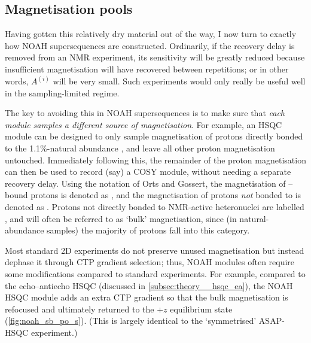 \subsection{Magnetisation pools}
\label{subsec:noah__magpools}

Having gotten this relatively dry material out of the way, I now turn to exactly how NOAH supersequences are constructed.
Ordinarily, if the recovery delay is removed from an NMR experiment, its sensitivity will be greatly reduced because insufficient magnetisation will have recovered between repetitions; or in other words, $A^{(i)}$ will be very small.
Such experiments would only really be useful well in the sampling-limited regime.

The key to avoiding this in NOAH supersequences is to make sure that \textit{each module samples a different source of magnetisation}.
For example, an HSQC module can be designed to only sample magnetisation of protons directly bonded to the 1.1\%-natural abundance \carbon{}, and leave all other proton magnetisation untouched.
Immediately following this, the remainder of the proton magnetisation can then be used to record (say) a COSY module, without needing a separate recovery delay.
Using the notation of Orts and Gossert\autocite{Orts2018M}, the magnetisation of \carbon{}--bound protons is denoted as , and the magnetisation of protons \textit{not} bonded to \carbon{} is denoted as .
Protons not directly bonded to NMR-active heteronuclei are labelled , and will often be referred to as `bulk' magnetisation, since (in natural-abundance samples) the majority of protons fall into this category.

Most standard 2D experiments do not preserve unused magnetisation but instead dephase it through CTP gradient selection; thus, NOAH modules often require some modifications compared to standard experiments.
For example, compared to the echo--antiecho HSQC (discussed in \cref{subsec:theory__hsqc_ea}), the NOAH HSQC module\autocite{Kupce2017ACIE} adds an extra CTP gradient so that the bulk magnetisation is refocused and ultimately returned to the $+z$ equilibrium state (\cref{fig:noah_sb_po_s}).
(This is largely identical to the `symmetrised' ASAP-HSQC experiment\autocite{SchulzeSunninghausen2017JMR}.)

